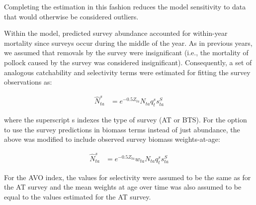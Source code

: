 \documentclass[11pt,
  english,
  a4paper,
]{article}
\begin{document}
\leavevmode\tagmcend\tagstructend\par


Completing the estimation in this fashion reduces the model sensitivity to data that would otherwise be considered outliers.

\leavevmode\tagmcend\tagstructend\par


Within the model, predicted survey abundance accounted for within-year mortality since surveys occur during the middle of the year. As in previous years, we assumed that removals by the survey were insignificant (i.e., the mortality of pollock caused by the survey was considered insignificant). Consequently, a set of analogous catchability and selectivity terms were estimated for fitting the survey observations as:

\leavevmode\tagmcend\tagstructend\par


\begin{align}
\hat N_{ta}^s &= e^{-0.5Z_{ta}}N_{ta}q_t^ss_{ta}^S
\end{align}

\leavevmode\tagmcend\tagstructend\par


where the superscript s indexes the type of survey (AT or BTS). For the option to use the survey predictions in biomass terms instead of just abundance, the above was modified to include observed survey biomass weights-at-age:

\leavevmode\tagmcend\tagstructend\par


\begin{align}
\hat N_{ta}^s &= e^{-0.5Z_{ta}}w_{ta}N_{ta}q_t^ss_{ta}^S
\end{align}

\leavevmode\tagmcend\tagstructend\par


For the AVO index, the values for selectivity were assumed to be the same as for the AT survey and the mean weights at age over time was also assumed to be equal to the values estimated for the AT survey.
\end{document}
